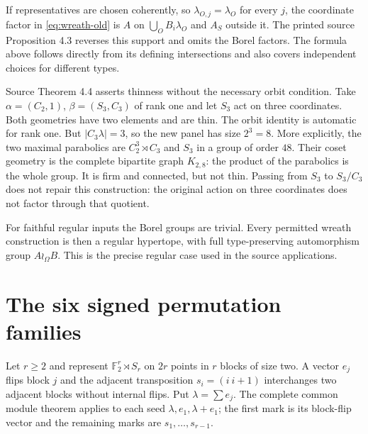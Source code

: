 If representatives are chosen coherently, so $\lambda_{O,j}=\lambda_O$
for every $j$, the coordinate factor in \eqref{eq:wreath-old} is $A$
on $\bigcup_O B_i\lambda_O$ and $A_S$ outside it. The printed source
Proposition 4.3 reverses this support and omits the Borel factors. The
formula above follows directly from its defining intersections and also
covers independent choices for different types.

Source Theorem 4.4 asserts thinness without the necessary orbit condition.
Take $\alpha=(C_2,1)$, $\beta=(S_3,C_3)$ of rank one and let $S_3$
act on three coordinates. Both geometries have two elements and are
thin. The orbit identity is automatic for rank one. But
$|C_3\lambda|=3$, so the new panel has size $2^3=8$. More explicitly,
the two maximal parabolics are $C_2^3\rtimes C_3$ and $S_3$ in a
group of order $48$. Their coset geometry is the complete bipartite
graph $K_{2,8}$: the product of the parabolics is the whole group.
It is firm and connected, but not thin. Passing from $S_3$ to $S_3/C_3$
does not repair this construction: the original action on three coordinates
does not factor through that quotient.

For faithful regular inputs the Borel groups are trivial. Every permitted
wreath construction is then a regular hypertope, with full type-preserving
automorphism group $A\wr_\Omega B$. This is the precise regular case
used in the source applications.

\section{The six signed permutation families}
Let $r\geq2$ and represent $\mathbb F_2^r\rtimes S_r$ on $2r$ points
in $r$ blocks of size two. A vector $e_j$ flips block $j$ and the
adjacent transposition $s_i=(i\ i+1)$ interchanges two adjacent blocks
without internal flips. Put $\lambda=\sum e_j$. The complete common
module theorem applies to each seed $\lambda,e_1,\lambda+e_1$;
the first mark is its block-flip vector and the remaining marks are
$s_1,\ldots,s_{r-1}$.


